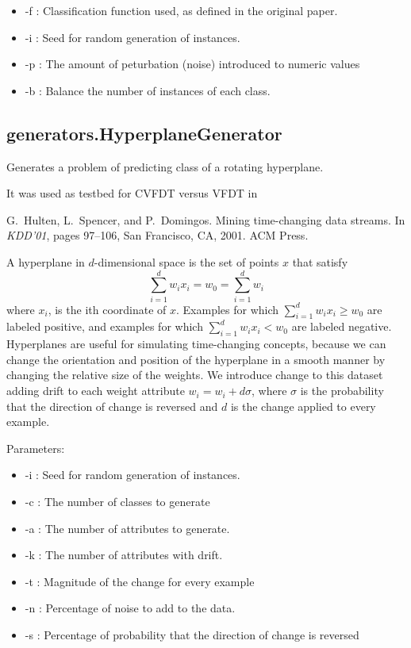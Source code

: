 \documentclass[a4paper,12pt,twoside]{book}
\begin{document}
\begin{itemize}
\item -f : Classification function used, as defined in the original paper.
\item -i : Seed for random generation of instances.
\item -p : The amount of peturbation (noise) introduced to numeric values
\item -b : Balance the number of instances of each class.\end{itemize}


\subsection{generators.HyperplaneGenerator} Generates a problem of predicting class of a rotating hyperplane.

It was used as testbed for CVFDT 
versus VFDT in
\begin{itemize}
G.~Hulten, L.~Spencer, and P.~Domingos.
\newblock Mining time-changing data streams.
\newblock In {\em KDD'01}, pages 97--106, San Francisco, CA, 2001. ACM Press.\end{itemize}

 A hyperplane in $d$-dimensional space is the
set of points $x$ that satisfy $$ \sum^{d}_{i=1} w_i x_i = w_0 = \sum^{d}_{i=1} w_i  $$
where $x_i$, is the ith coordinate of $x$. Examples for which $ \sum^{d}_{i=1} w_i x_i \ge w_0 $  
are labeled positive, and examples for which  $ \sum^{d}_{i=1} w_i x_i < w_0 $
are labeled negative. 
Hyperplanes are useful for simulating time-changing concepts, because we can
change the orientation and position of the hyperplane in a
smooth manner by changing the relative size of the weights.
We introduce change to this dataset adding drift to each weight attribute 
 $w_i = w_i + d\sigma$,
where $\sigma$ is the probability that the direction of change is reversed and $d$ is
the change applied to every example.

Parameters:

\begin{itemize}
\item -i : Seed for random generation of instances.
\item -c : The number of classes to generate
\item -a : The number of attributes to generate.
\item -k : The number of attributes with drift.
\item -t : Magnitude of the change for every example
\item -n : Percentage of noise to add to the data.
\item -s : Percentage of probability that the direction of change is reversed\end{itemize}
\end{document}

